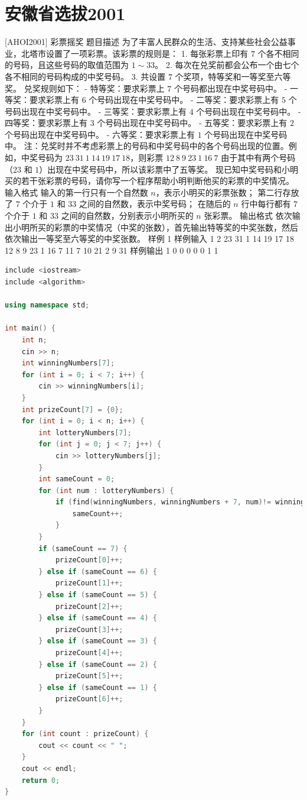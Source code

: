 \documentclass[12pt,twiside,a4paper]{ctexbook}
\numberwithin{chapter}{part}
\begin{document}
\section{安徽省选拔2001}
 [AHOI2001] 彩票摇奖
 题目描述
为了丰富人民群众的生活、支持某些社会公益事业，北塔市设置了一项彩票。该彩票的规则是：
1. 每张彩票上印有 $7$ 个各不相同的号码，且这些号码的取值范围为 $1\sim33$。
2. 每次在兑奖前都会公布一个由七个各不相同的号码构成的中奖号码。
3. 共设置 $7$ 个奖项，特等奖和一等奖至六等奖。
兑奖规则如下：
- 特等奖：要求彩票上 $7$ 个号码都出现在中奖号码中。
- 一等奖：要求彩票上有 $6$ 个号码出现在中奖号码中。
- 二等奖：要求彩票上有 $5$ 个号码出现在中奖号码中。
- 三等奖：要求彩票上有 $4$ 个号码出现在中奖号码中。
- 四等奖：要求彩票上有 $3$ 个号码出现在中奖号码中。
- 五等奖：要求彩票上有 $2$ 个号码出现在中奖号码中。
- 六等奖：要求彩票上有 $1$ 个号码出现在中奖号码中。
注：兑奖时并不考虑彩票上的号码和中奖号码中的各个号码出现的位置。例如，中奖号码为 $23\ 31\ 1\ 14\ 19\ 17\ 18$，则彩票 $12\ 8\ 9\ 23\ 1\ 16\ 7$ 由于其中有两个号码（$23$ 和 $1$）出现在中奖号码中，所以该彩票中了五等奖。
现已知中奖号码和小明买的若干张彩票的号码，请你写一个程序帮助小明判断他买的彩票的中奖情况。
 输入格式
输入的第一行只有一个自然数 $n$，表示小明买的彩票张数；
第二行存放了 $7$ 个介于 $1$ 和 $33$ 之间的自然数，表示中奖号码；
在随后的 $n$ 行中每行都有 $7$ 个介于 $1$ 和 $33$ 之间的自然数，分别表示小明所买的 $n$ 张彩票。
 输出格式
依次输出小明所买的彩票的中奖情况（中奖的张数），首先输出特等奖的中奖张数，然后依次输出一等奖至六等奖的中奖张数。
 样例 1
 样例输入 1
2
23 31 1 14 19 17 18
12 8 9 23 1 16 7
11 7 10 21 2 9 31
 样例输出 1
0 0 0 0 0 1 1
\begin{lstlisting}[language=c++,breaklines=true]
include <iostream>
include <algorithm>

using namespace std;

int main() {
    int n;
    cin >> n;
    int winningNumbers[7];
    for (int i = 0; i < 7; i++) {
        cin >> winningNumbers[i];
    }
    int prizeCount[7] = {0};
    for (int i = 0; i < n; i++) {
        int lotteryNumbers[7];
        for (int j = 0; j < 7; j++) {
            cin >> lotteryNumbers[j];
        }
        int sameCount = 0;
        for (int num : lotteryNumbers) {
            if (find(winningNumbers, winningNumbers + 7, num)!= winningNumbers + 7) {
                sameCount++;
            }
        }
        if (sameCount == 7) {
            prizeCount[0]++;
        } else if (sameCount == 6) {
            prizeCount[1]++;
        } else if (sameCount == 5) {
            prizeCount[2]++;
        } else if (sameCount == 4) {
            prizeCount[3]++;
        } else if (sameCount == 3) {
            prizeCount[4]++;
        } else if (sameCount == 2) {
            prizeCount[5]++;
        } else if (sameCount == 1) {
            prizeCount[6]++;
        }
    }
    for (int count : prizeCount) {
        cout << count << " ";
    }
    cout << endl;
    return 0;
}
\end{lstlisting}
\end{document}
